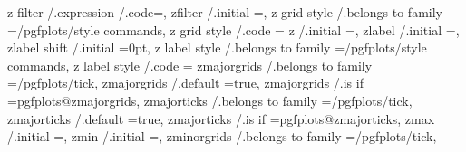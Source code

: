 {z filter                 /.expression                                                                                             /.code=,
zfilter                  /.initial                                                                                                      =,%
z grid style             /.belongs to family                                                                                            =/pgfplots/style commands,
z grid style             /.code                                                                                                         ={%
z                        /.initial                                                                                                      =,
zlabel                   /.initial                                                                                                      =,
zlabel shift             /.initial                                                                                                      =0pt,
z label style            /.belongs to family                                                                                            =/pgfplots/style commands,
z label style            /.code                                                                                                         ={%
zmajorgrids              /.belongs to family                                                                                            =/pgfplots/tick,
zmajorgrids              /.default                                                                                                      =true,
zmajorgrids              /.is if                                                                                                        =pgfplots@zmajorgrids,
zmajorticks              /.belongs to family                                                                                            =/pgfplots/tick,
zmajorticks              /.default                                                                                                      =true,
zmajorticks              /.is if                                                                                                        =pgfplots@zmajorticks,
zmax                     /.initial                                                                                                      =,
zmin                     /.initial                                                                                                      =,
zminorgrids              /.belongs to family                                                                                            =/pgfplots/tick,
}}}
